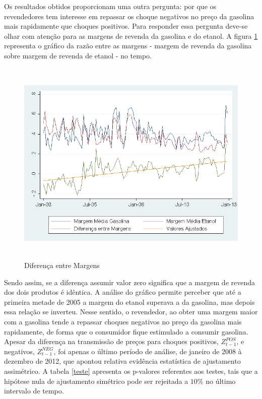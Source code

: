 \documentclass[
	article,			%
	12pt,				%
	openright,			%
	oneside,			%
	a4paper,			%
	english,			%
	brazil				%
	]{abntex2}
\begin{document}
Os resultados obtidos proporcionam uma outra pergunta: por que os revendedores tem interesse em repassar os choque negativos no preço da gasolina mais rapidamente que choques positivos. Para responder essa pergunta deve-se olhar com atenção para as margens de revenda da gasolina e do etanol. A figura \ref{kerr} representa o gráfico da razão entre as margens - margem de revenda da gasolina sobre margem de revenda de etanol - no tempo. 

\begin{figure}
    \caption{Diferença entre Margens \label {kerr}}
    \centerline{\includegraphics[width=16cm, height=10cm]{margens.png}}
\end{figure}

Sendo assim, se a diferença assumir valor zero significa que a margem de revenda dos dois produtos é idêntica. A análise do gráfico permite perceber que até a primeira metade de 2005 a margem do etanol superava a da gasolina, mas depois essa relação se inverteu. Nesse sentido, o revendedor, ao obter uma margem maior com a gasolina tende a repassar choques negativos no preço da gasolina mais rapidamente, de forma que o consumidor fique estimulado a consumir gasolina. Apesar da diferença na transmissão de preços para choques positivos, $Z^{POS}_{t-1}$, e negativos, $Z^{NEG}_{t-1}$, foi apenas o último período de análise, de janeiro de 2008 à dezembro de 2012, que apontou relativa evidência estatística de ajustamento assimétrico. A tabela \ref{teste} apresenta os p-valores referentes aos testes, tais que a hipótese nula de ajustamento simétrico pode ser rejeitada a $10\%$ no último intervalo de tempo.
\end{document}
